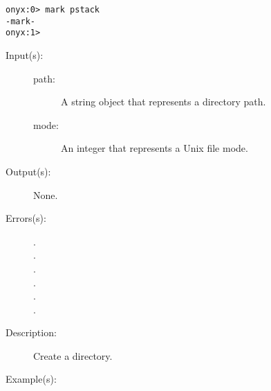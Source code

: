 \begin{description}
\begin{description}
\begin{verbatim}
onyx:0> mark pstack
-mark-
onyx:1>
		\end{verbatim}
	\end{description}
\label{systemdict:mkdir}
\item[{\onyxop{path mode}{mkdir}{--}}: ]
	\begin{description}\item[]
	\item[Input(s): ]
		\begin{description}\item[]
		\item[path: ]
			A string object that represents a directory path.
		\item[mode: ]
			An integer that represents a Unix file mode.
		\end{description}
	\item[Output(s): ] None.
	\item[Errors(s): ]
		\begin{description}\item[]
		\item[.]
		\item[.]
		\item[.]
		\item[.]
		\item[.]
		\item[.]
		\end{description}
	\item[Description: ]
		Create a directory.
	\item[Example(s): ]\begin{verbatim}


\end{verbatim}
\end{description}
\end{description}
